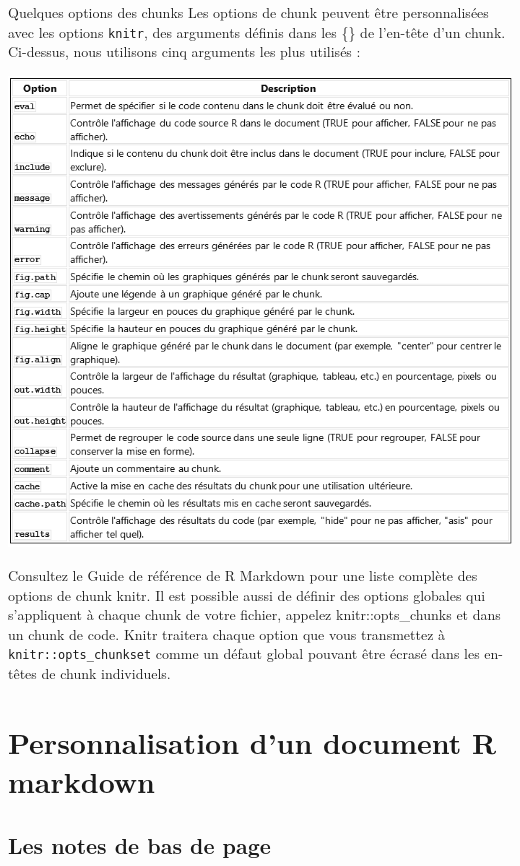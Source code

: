 \documentclass[
  12pt,
]{article}
\begin{document}
Quelques options des chunks Les options de chunk peuvent être
personnalisées avec les options \texttt{knitr}, des arguments définis
dans les \{\} de l'en-tête d'un chunk. Ci-dessus, nous utilisons cinq
arguments les plus utilisés :

\begin{center}\includegraphics[width=1\linewidth,height=1\textheight]{../Document_Rmarkdown/Images/Options_chunk} \end{center}

Consultez le Guide de référence de R Markdown pour une liste complète
des options de chunk knitr. Il est possible aussi de définir des options
globales qui s'appliquent à chaque chunk de votre fichier, appelez
knitr::opts\_chunks et dans un chunk de code. Knitr traitera chaque
option que vous transmettez à \texttt{knitr::opts\_chunkset} comme un
défaut global pouvant être écrasé dans les en-têtes de chunk
individuels.

\newpage

\section{Personnalisation d'un document R
markdown}\label{personnalisation-dun-document-r-markdown}

\subsection{Les notes de bas de page}\label{les-notes-de-bas-de-page}
\end{document}
